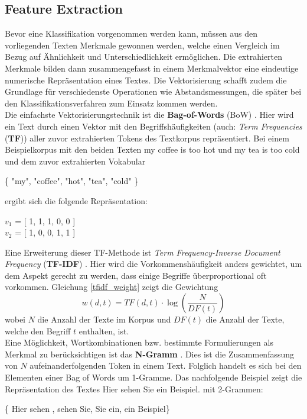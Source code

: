 \subsection{Feature Extraction}
Bevor eine Klassifikation vorgenommen werden kann, müssen aus den vorliegenden Texten Merkmale gewonnen werden, welche einen Vergleich im Bezug auf Ähnlichkeit und Unterschiedlichkeit ermöglichen. Die extrahierten Merkmale bilden dann zusammengefasst in einem Merkmalvektor eine eindeutige numerische Repräsentation eines Textes. Die Vektorisierung schafft zudem die Grundlage für verschiedenste Operationen wie Abstandsmessungen, die später bei den Klassifikationsverfahren zum Einsatz kommen werden.\\
Die einfachste Vektorisierungstechnik ist die \textbf{Bag-of-Words} (BoW) \citep{Ramos13}. Hier wird ein Text durch einen Vektor mit den Begriffshäufigkeiten (auch: \textit{Term Frequencies} (\textbf{TF})) aller zuvor extrahierten Tokens des Textkorpus repräsentiert. Bei einem Beispielkorpus mit den beiden Texten \glqq my coffee is too hot\grqq{} und \glqq my tea is too cold\grqq{} und dem zuvor extrahierten Vokabular
\begin{flushleft}
	\hfil\{ "my", "coffee", "hot", "tea", "cold" \}
\end{flushleft}
ergibt sich die folgende Repräsentation:
\begin{flushleft}
	\hfil$v_1$ = [ 1, 1, 1, 0, 0 ]\\
	\hfil$v_2$ = [ 1, 0, 0, 1, 1 ]
\end{flushleft}
Eine Erweiterung dieser TF-Methode ist \textit{Term Frequency-Inverse Document Frequency} (\textbf{TF-IDF}) \citep{Ramos13}.  Hier wird die Vorkommenshäufigkeit anders gewichtet, um dem Aspekt gerecht zu werden, dass einige Begriffe überproportional oft vorkommen. Gleichung \ref{tfidf_weight} zeigt die Gewichtung 
\begin{equation}
	w(d,t) = TF(d,t) \cdot \log \left( \frac{N}{{DF}(t)} \right)
	\label{tfidf_weight}
\end{equation} 
wobei $N$ die Anzahl der Texte im Korpus und ${DF}(t)$ die Anzahl der Texte, welche den Begriff $t$ enthalten, ist.\\
Eine Möglichkeit, Wortkombinationen bzw. bestimmte Formulierungen als Merkmal zu berücksichtigen ist das \textbf{N-Gramm} \citep{Kow19}. Dies ist die Zusammenfassung von $N$ aufeinanderfolgenden Token in einem Text. Folglich handelt es sich bei den Elementen einer Bag of Words um 1-Gramme. Das nachfolgende Beispiel zeigt die Repräsentation des Textes \glqq Hier sehen Sie ein Beispiel.\grqq{} mit 2-Grammen:
\begin{flushleft}
	\hfil \{ \grqq Hier sehen \grqq, \grqq sehen Sie\grqq, \grqq Sie ein\grqq, \grqq ein Beispiel\grqq \}
\end{flushleft}
